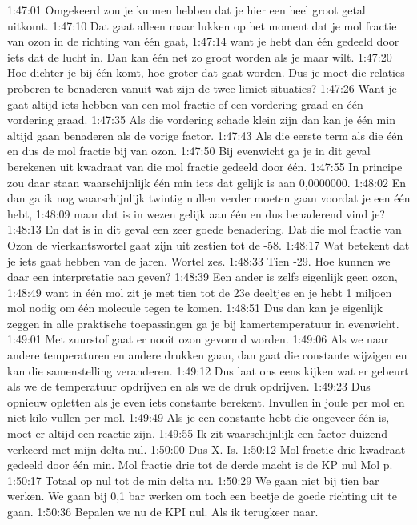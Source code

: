 1:47:01
Omgekeerd zou je kunnen hebben dat je hier een heel groot getal uitkomt.
1:47:10
Dat gaat alleen maar lukken op het moment dat je mol fractie van ozon in de richting van één gaat,
1:47:14
want je hebt dan één gedeeld door iets dat de lucht in. Dan kan één net zo groot worden als je maar wilt.
1:47:20
Hoe dichter je bij één komt, hoe groter dat gaat worden. Dus je moet die relaties proberen te benaderen vanuit wat zijn de twee limiet situaties?
1:47:26
Want je gaat altijd iets hebben van een mol fractie of een vordering graad en één vordering graad.
1:47:35
Als die vordering schade klein zijn dan kan je één min altijd gaan benaderen als de vorige factor.
1:47:43
Als die eerste term als die één en dus de mol fractie bij van ozon.
1:47:50
Bij evenwicht ga je in dit geval berekenen uit kwadraat van die mol fractie gedeeld door één.
1:47:55
In principe zou daar staan waarschijnlijk één min iets dat gelijk is aan 0,0000000.
1:48:02
En dan ga ik nog waarschijnlijk twintig nullen verder moeten gaan voordat je een één hebt,
1:48:09
maar dat is in wezen gelijk aan één en dus benaderend vind je?
1:48:13
En dat is in dit geval een zeer goede benadering. Dat die mol fractie van Ozon de vierkantswortel gaat zijn uit zestien tot de -58.
1:48:17
Wat betekent dat je iets gaat hebben van de jaren. Wortel zes.
1:48:33
Tien -29. Hoe kunnen we daar een interpretatie aan geven?
1:48:39
Een ander is zelfs eigenlijk geen ozon,
1:48:49
want in één mol zit je met tien tot de 23e deeltjes en je hebt 1 miljoen mol nodig om één molecule tegen te komen.
1:48:51
Dus dan kan je eigenlijk zeggen in alle praktische toepassingen ga je bij kamertemperatuur in evenwicht.
1:49:01
Met zuurstof gaat er nooit ozon gevormd worden.
1:49:06
Als we naar andere temperaturen en andere drukken gaan, dan gaat die constante wijzigen en kan die samenstelling veranderen.
1:49:12
Dus laat ons eens kijken wat er gebeurt als we de temperatuur opdrijven en als we de druk opdrijven.
1:49:23
Dus opnieuw opletten als je even iets constante berekent. Invullen in joule per mol en niet kilo vullen per mol.
1:49:49
Als je een constante hebt die ongeveer één is, moet er altijd een reactie zijn.
1:49:55
Ik zit waarschijnlijk een factor duizend verkeerd met mijn delta nul.
1:50:00
Dus X. Is.
1:50:12
Mol fractie drie kwadraat gedeeld door één min. Mol fractie drie tot de derde macht is de KP nul Mol p.
1:50:17
Totaal op nul tot de min delta nu.
1:50:29
We gaan niet bij tien bar werken. We gaan bij 0,1 bar werken om toch een beetje de goede richting uit te gaan.
1:50:36
Bepalen we nu de KPI nul. Als ik terugkeer naar.
